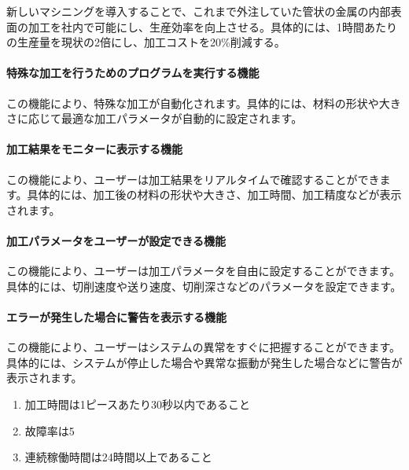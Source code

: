 新しいマシニングを導入することで、これまで外注していた管状の金属の内部表面の加工を社内で可能にし、生産効率を向上させる。具体的には、1時間あたりの生産量を現状の2倍にし、加工コストを20\%削減する。



\paragraph*{特殊な加工を行うためのプログラムを実行する機能}
この機能により、特殊な加工が自動化されます。具体的には、材料の形状や大きさに応じて最適な加工パラメータが自動的に設定されます。

\paragraph*{加工結果をモニターに表示する機能}
この機能により、ユーザーは加工結果をリアルタイムで確認することができます。具体的には、加工後の材料の形状や大きさ、加工時間、加工精度などが表示されます。

\paragraph*{加工パラメータをユーザーが設定できる機能}
この機能により、ユーザーは加工パラメータを自由に設定することができます。具体的には、切削速度や送り速度、切削深さなどのパラメータを設定できます。

\paragraph*{エラーが発生した場合に警告を表示する機能}
この機能により、ユーザーはシステムの異常をすぐに把握することができます。具体的には、システムが停止した場合や異常な振動が発生した場合などに警告が表示されます。



\begin{enumerate}
\item 加工時間は1ピースあたり30秒以内であること
\item 故障率は5%
\item 連続稼働時間は24時間以上であること
\end{enumerate}



